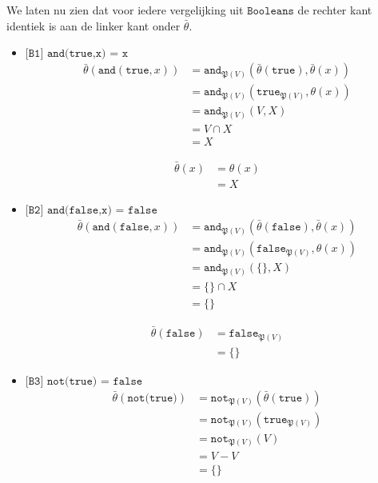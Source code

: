 \documentclass[a4paper,11pt]{article}
\begin{document}
We laten nu zien dat voor iedere vergelijking uit $\texttt{Booleans}$ de
rechter kant identiek is aan de linker kant onder $\bar \theta$.

\begin{itemize}

\item{$\texttt{[B1] and(true,x) = x}$}
\begin{align*}
\bar \theta(\texttt{and}(\texttt{true}, x)) &= \texttt{and}_{\mathfrak{P}(V)}(\bar \theta(\texttt{true}), \bar \theta(x)) \\
                                            &= \texttt{and}_{\mathfrak{P}(V)}(\texttt{true}_{\mathfrak{P}(V)}, \theta(x)) \\
                                            &= \texttt{and}_{\mathfrak{P}(V)}(V,X) \\
                                            &= V \cap X \\
                                            &= X
\end{align*}

\begin{align*}
\bar \theta(x) &= \theta(x) \\
               &= X
\end{align*}

\item{$\texttt{[B2] and(false,x) = false}$}
\begin{align*}
\bar \theta(\texttt{and}(\texttt{false}, x)) &= \texttt{and}_{\mathfrak{P}(V)}(\bar \theta(\texttt{false}), \bar \theta(x)) \\
                                             &= \texttt{and}_{\mathfrak{P}(V)}(\texttt{false}_{\mathfrak{P}(V)}, \theta(x)) \\
                                             &= \texttt{and}_{\mathfrak{P}(V)}(\{\},X) \\
                                             &= \{\} \cap X \\
                                             &= \{\}
\end{align*}

\begin{align*}
\bar \theta(\texttt{false}) &= \texttt{false}_{\mathfrak{P}(V)} \\
                            &= \{\}
\end{align*}

\item{$\texttt{[B3] not(true) = false}$}
\begin{align*}
\bar \theta(\texttt{not(true)}) &= \texttt{not}_{\mathfrak{P}(V)}(\bar \theta(\texttt{true})) \\
                                &= \texttt{not}_{\mathfrak{P}(V)}(\texttt{true}_{\mathfrak{P}(V)}) \\
                                &= \texttt{not}_{\mathfrak{P}(V)}(V) \\
                                &= V - V \\
                                &= \{\}
\end{align*}


\end{itemize}
\end{document}

